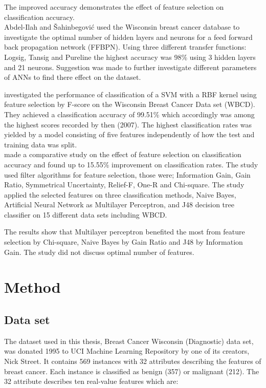 \documentclass{kththesis}
\begin{document}
The improved accuracy demonstrates the effect of feature selection on classification accuracy.\\

Abdel-Ilah and {\v{S}}ahinbegovi{\'{c}} \parencite{Abdel-Ilah2017} used the Wisconsin breast cancer database to investigate the optimal number of hidden layers and neurons for a feed forward back propagation network (FFBPN). Using three different transfer functions: Logsig, Tansig and Pureline the highest accuracy was 98\% using 3 hidden layers and 21 neurons. Suggestion was made to further investigate different parameters of ANNs to find there effect on the dataset.

\textcite{akay2009} investigated the performance of classification of a SVM with a RBF kernel using feature selection by F-score on the Wisconsin Breast Cancer Data set (WBCD). They achieved a classification accuracy of 99.51\% which accordingly was among the highest scores recorded by then (2007). The highest classification rates was yielded by a model consisting of five features independently of how the test and training data was split. \\

\textcite{karabulut2012} made a comparative study on the effect of feature selection on classification accuracy and found up to 15.55\% improvement on classification rates. The study used filter algorithms for feature selection, those were; Information Gain, Gain Ratio, Symmetrical Uncertainty, Relief-F, One-R and Chi-square. The study applied the selected features on three classification methods, Naive Bayes, Artificial Neural Network as Multilayer Perceptron, and J48 decision tree classifier on 15 different data sets including WBCD.

The results show that Multilayer perceptron benefited the most from feature selection by Chi-square, Naive Bayes by Gain Ratio and J48 by Information Gain. The study did not discuss optimal number of features.

\chapter{Method}

\section{Data set}

The dataset used in this thesis, Breast Cancer Wisconsin (Diagnostic) data set, was donated 1995 to UCI  Machine Learning Repository \parencite{dua:2017} by one of its creators, Nick Street. It contains 569 instances with 32 attributes describing the features of breast cancer. Each instance is classified as benign (357) or malignant (212). The 32 attribute describes ten real-value features which are:
\end{document}
